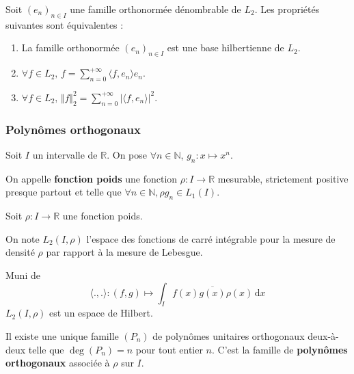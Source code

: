   \begin{theorem}
    Soit $(e_n)_{n \in I}$ une famille orthonormée dénombrable de $L_2$. Les propriétés suivantes sont équivalentes :
    \begin{enumerate}[label={\bfseries(\roman*)}]
      \item La famille orthonormée $(e_n)_{n \in I}$ est une base hilbertienne de $L_2$.
      \item $\forall f \in L_2, \, f = \sum_{n=0}^{+\infty} \langle f, e_n \rangle e_n$.
      \item $\forall f \in L_2, \, \Vert f \Vert_2^2 = \sum_{n=0}^{+\infty} \vert \langle f, e_n \rangle \vert^2$.
    \end{enumerate}
  \end{theorem}

  \subsubsection{Polynômes orthogonaux}


  Soit $I$ un intervalle de $\mathbb{R}$. On pose $\forall n \in \mathbb{N}$, $g_n : x \mapsto x^n$.

  \begin{definition}
    On appelle \textbf{fonction poids} une fonction $\rho : I \rightarrow \mathbb{R}$ mesurable, strictement positive presque partout et telle que $\forall n \in \mathbb{N}, \rho g_n \in L_1(I)$.
  \end{definition}

  Soit $\rho : I \rightarrow \mathbb{R}$ une fonction poids.

  \begin{notation}
    On note $L_2(I, \rho)$ l'espace des fonctions de carré intégrable pour la mesure de densité $\rho$ par rapport à la mesure de Lebesgue.
  \end{notation}

  \begin{proposition}
    Muni de
    \[ \langle ., . \rangle : (f,g) \mapsto \int_I f(x) \overline{g(x)} \rho(x) \, \mathrm{d}x \]
    $L_2(I, \rho)$ est un espace de Hilbert.
  \end{proposition}

  \begin{theorem}
    Il existe une unique famille $(P_n)$ de polynômes unitaires orthogonaux deux-à-deux telle que $\deg(P_n) = n$ pour tout entier $n$. C'est la famille de \textbf{polynômes orthogonaux} associée à $\rho$ sur $I$.
  \end{theorem}

